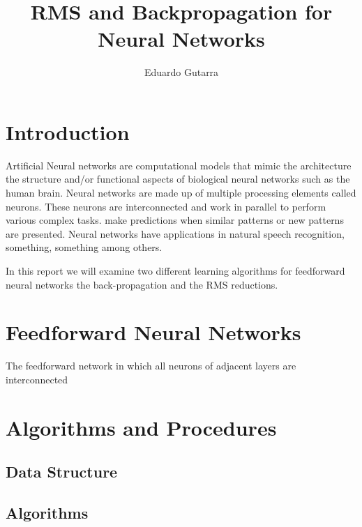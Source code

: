 \documentclass[11pt]{article}
\title{RMS and Backpropagation for Neural Networks}
\author{Eduardo Gutarra}
\begin{document}
	
\ifpdf
{}
\else
{}
\fi
	
\maketitle
	
\section{Introduction} %
\label{sec:introduction}

Artificial Neural networks are computational models that mimic the architecture the structure and/or functional aspects of biological
neural networks such as the human brain. Neural networks are made up of multiple processing elements called neurons. These neurons are
interconnected and work in parallel to perform various complex tasks. make predictions when similar patterns or new patterns are presented. Neural
networks have applications in natural speech recognition, something, something among others.

In this report we will examine two different learning algorithms for feedforward neural networks the back-propagation and the RMS
reductions.

\section{Feedforward Neural Networks} %
\label{sec:feedforward_neural_networks}

The feedforward network in which all neurons of adjacent layers are interconnected






\section{Algorithms and Procedures} %
\label{sec:algorithms_and_procedures}

\subsection{Data Structure} %
\label{sub:data_structure}


\subsection{Algorithms} %
\label{sub:algorithms}
\end{document}
